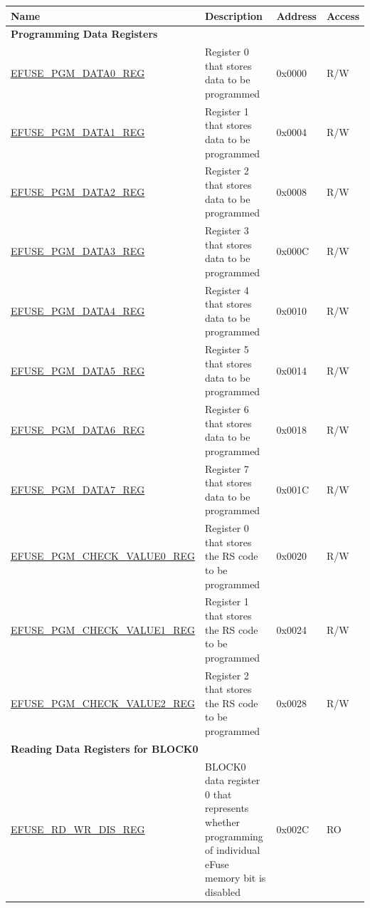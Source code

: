 \begin{longtable}{ | p{7.2cm} | p{6cm} | p{1.3cm} | p{1cm} | }
\hline\rowcolor{lightgray}
Name & Description &  Address & Access \\ \hline
\endhead
\multicolumn{4}{|l|}{\textbf{Programming Data Registers}} \\ \hline
\hyperref[regdesc:EFUSEPGMDATANREG]{EFUSE\_PGM\_DATA0\_REG} & Register 0 that stores data to be programmed & 0x0000 & R/W \\ \hline
\hyperref[regdesc:EFUSEPGMDATANREG]{EFUSE\_PGM\_DATA1\_REG} & Register 1 that stores data to be programmed & 0x0004 & R/W \\ \hline
\hyperref[regdesc:EFUSEPGMDATANREG]{EFUSE\_PGM\_DATA2\_REG} & Register 2 that stores data to be programmed & 0x0008 & R/W \\ \hline
\hyperref[regdesc:EFUSEPGMDATANREG]{EFUSE\_PGM\_DATA3\_REG} & Register 3 that stores data to be programmed & 0x000C & R/W \\ \hline
\hyperref[regdesc:EFUSEPGMDATANREG]{EFUSE\_PGM\_DATA4\_REG} & Register 4 that stores data to be programmed & 0x0010 & R/W \\ \hline
\hyperref[regdesc:EFUSEPGMDATANREG]{EFUSE\_PGM\_DATA5\_REG} & Register 5 that stores data to be programmed & 0x0014 & R/W \\ \hline
\hyperref[regdesc:EFUSEPGMDATANREG]{EFUSE\_PGM\_DATA6\_REG} & Register 6 that stores data to be programmed & 0x0018 & R/W \\ \hline
\hyperref[regdesc:EFUSEPGMDATANREG]{EFUSE\_PGM\_DATA7\_REG} & Register 7 that stores data to be programmed & 0x001C & R/W \\ \hline
\hyperref[regdesc:EFUSEPGMCHECKVALUENREG]{EFUSE\_PGM\_CHECK\_VALUE0\_REG} & Register 0 that stores the RS code to be programmed & 0x0020 & R/W \\ \hline
\hyperref[regdesc:EFUSEPGMCHECKVALUENREG]{EFUSE\_PGM\_CHECK\_VALUE1\_REG} & Register 1 that stores the RS code to be programmed & 0x0024 & R/W \\ \hline
\hyperref[regdesc:EFUSEPGMCHECKVALUENREG]{EFUSE\_PGM\_CHECK\_VALUE2\_REG} & Register 2 that stores the RS code to be programmed & 0x0028 & R/W \\ \hline
\multicolumn{4}{|l|}{\textbf{Reading Data Registers for BLOCK0}} \\ \hline
\hyperref[regdesc:EFUSERDWRDISREG]{EFUSE\_RD\_WR\_DIS\_REG} & BLOCK0 data register 0 that represents whether programming of individual eFuse memory bit is disabled & 0x002C & RO \\ \hline

\end{longtable}
